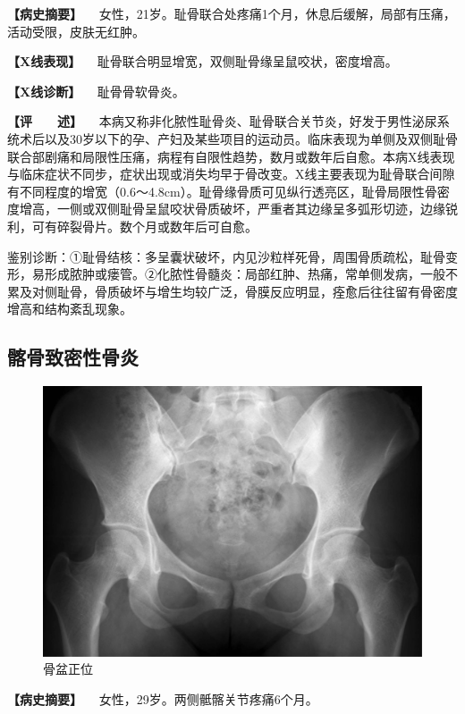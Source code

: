 \textbf{【病史摘要】}
　女性，21岁。耻骨联合处疼痛1个月，休息后缓解，局部有压痛，活动受限，皮肤无红肿。

\textbf{【X线表现】} 　耻骨联合明显增宽，双侧耻骨缘呈鼠咬状，密度增高。

\textbf{【X线诊断】} 　耻骨骨软骨炎。

\textbf{【评　　述】}
　本病又称非化脓性耻骨炎、耻骨联合关节炎，好发于男性泌尿系统术后以及30岁以下的孕、产妇及某些项目的运动员。临床表现为单侧及双侧耻骨联合部剧痛和局限性压痛，病程有自限性趋势，数月或数年后自愈。本病X线表现与临床症状不同步，症状出现或消失均早于骨改变。X线主要表现为耻骨联合间隙有不同程度的增宽（0.6～4.8cm）。耻骨缘骨质可见纵行透亮区，耻骨局限性骨密度增高，一侧或双侧耻骨呈鼠咬状骨质破坏，严重者其边缘呈多弧形切迹，边缘锐利，可有碎裂骨片。数个月或数年后可自愈。

鉴别诊断：①耻骨结核：多呈囊状破坏，内见沙粒样死骨，周围骨质疏松，耻骨变形，易形成脓肿或瘘管。②化脓性骨髓炎：局部红肿、热痛，常单侧发病，一般不累及对侧耻骨，骨质破坏与增生均较广泛，骨膜反应明显，痊愈后往往留有骨密度增高和结构紊乱现象。

\subsection{髂骨致密性骨炎}

\begin{figure}[!htbp]
 \centering
 \includegraphics{./images/Image00070.jpg}
 \captionsetup{justification=centering}
 \caption{骨盆正位}
 \label{fig2-4-9}
  \end{figure} 

\textbf{【病史摘要】} 　女性，29岁。两侧骶髂关节疼痛6个月。

